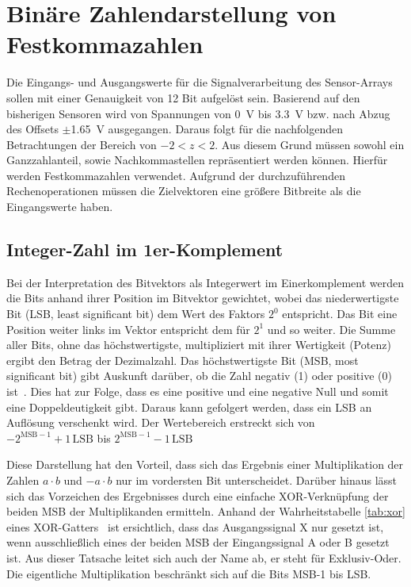 \section{Binäre Zahlendarstellung von Festkommazahlen}

Die Eingangs- und Ausgangswerte für die Signalverarbeitung des Sensor-Arrays sollen mit einer Genauigkeit von 12 Bit aufgelöst sein.
Basierend auf den bisherigen Sensoren wird von Spannungen von \SI{0}{V} bis \SI{3,3}{V} bzw. nach Abzug des Offsets $\pm$\SI{1,65}{V} 
ausgegangen. Daraus folgt für die nachfolgenden Betrachtungen der Bereich von $-2 < z < 2$.
Aus diesem Grund müssen sowohl ein Ganzzahlanteil, sowie Nachkommastellen repräsentiert werden können. 
Hierfür werden Festkommazahlen verwendet. Aufgrund der durchzuführenden Rechenoperationen müssen die Zielvektoren eine größere
Bitbreite als die Eingangswerte haben.


\subsection{Integer-Zahl im 1er-Komplement}
Bei der Interpretation des Bitvektors als Integerwert im Einerkomplement werden die Bits anhand ihrer Position im Bitvektor gewichtet, wobei das niederwertigste Bit 
(LSB, least significant bit) dem Wert des Faktors $2^0$ entspricht. Das Bit eine Position weiter links im Vektor entspricht dem für $2^1$ und so weiter. Die Summe aller Bits, ohne das höchstwertigste, 
multipliziert mit ihrer Wertigkeit (Potenz) ergibt den Betrag der Dezimalzahl. Das höchstwertigste Bit (MSB, most significant bit) gibt Auskunft darüber, ob die 
Zahl negativ (1) oder positive (0) ist~\autocite[76]{reichardt2013lehrbuch}. 
Dies hat zur Folge, dass es eine positive und eine negative Null und somit eine Doppeldeutigkeit gibt. Daraus kann gefolgert werden, dass ein
LSB an Auflösung verschenkt wird. Der Wertebereich erstreckt sich von $-2^{\mathrm{MSB}-1}+1\,\mathrm{LSB}$ bis $2^{\mathrm{MSB}-1}-1\,\mathrm{LSB}$

Diese Darstellung hat den Vorteil, dass sich das Ergebnis einer Multiplikation der Zahlen $a \cdot b$ und $-a \cdot b$ nur im vordersten Bit unterscheidet. Darüber hinaus
lässt sich das Vorzeichen des Ergebnisses durch eine einfache XOR-Verknüpfung der beiden MSB der Multiplikanden ermitteln. Anhand der Wahrheitstabelle \ref{tab:xor} eines XOR-Gatters~\autocite[37]{reichardt2013lehrbuch}
ist ersichtlich, dass das Ausgangssignal X nur gesetzt ist, wenn ausschließlich eines der beiden MSB der Eingangssignal A oder B gesetzt ist. 
Aus dieser Tatsache leitet sich auch der Name ab, er steht für Exklusiv-Oder. Die eigentliche Multiplikation beschränkt sich auf die Bits MSB-1 bis LSB.

